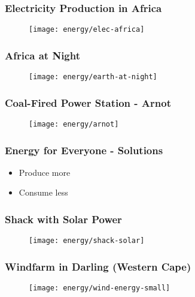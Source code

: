 \documentclass{beamer}
\begin{document}
\begin{frame}
  \frametitle{Electricity Production in Africa}
  \begin{figure}
  \centering
  \texttt{[image: energy/elec-africa]}
  \end{figure}
\end{frame}


\begin{frame}
\frametitle{Africa at Night}
  \begin{figure}
  \centering
  \texttt{[image: energy/earth-at-night]}
  \end{figure}  
\end{frame}

\begin{frame}
  \frametitle{Coal-Fired Power Station - Arnot}
  \begin{figure}
  \centering
  \texttt{[image: energy/arnot]}
  \end{figure}
\end{frame}


\begin{frame}
  \frametitle{Energy for Everyone - Solutions}
{\Large
\begin{itemize}
  \item Produce more
  \item Consume less
\end{itemize}}
\end{frame}


\begin{frame}
  \frametitle{Shack with Solar Power}
  \begin{figure}
  \centering
  \texttt{[image: energy/shack-solar]}
  \end{figure}
\end{frame}

\begin{frame}
  \frametitle{Windfarm in Darling (Western Cape)}
  \begin{figure}
  \centering
  \texttt{[image: energy/wind-energy-small]}
  \end{figure}
\end{frame}
\end{document}
